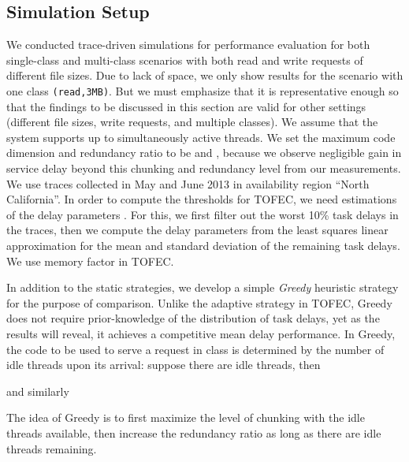 \documentclass[journal]{IEEEtran}
\newcommand{\ourproposal}{TOFEC\xspace}
\begin{document}
\subsection{Simulation Setup}
\label{ssec:eva:setup}

We conducted trace-driven simulations for performance evaluation for both single-class and multi-class scenarios with both read and write requests of different file sizes. 
Due to lack of space, we only show results for the scenario with one class {\tt (read,3MB)}. But we must emphasize that it is representative enough so that the findings to be discussed in this section are valid for other settings (different file sizes, write requests, and multiple classes). 
We assume that the system supports up to  simultaneously active threads. 
We set the maximum code dimension and redundancy ratio to be  and , because we observe negligible gain in service delay beyond this chunking and redundancy level from our measurements. 
We use traces collected in May and June 2013 in availability region ``North California''. In order to compute the thresholds for \ourproposal, we need estimations of the delay parameters . For this, we first filter out the worst 10\% task delays in the traces, then we compute the delay parameters from the least squares linear approximation for the mean and standard deviation of the remaining task delays. We use memory factor  in \ourproposal.

In addition to the static strategies, we develop a simple {\em Greedy} heuristic strategy for the purpose of comparison. Unlike the adaptive strategy in \ourproposal, Greedy does not require prior-knowledge of the distribution of task delays, yet as the results will reveal, it achieves a competitive mean delay performance. In Greedy, the code to be used to serve a request in class  is determined by the number of idle threads upon its arrival: suppose there are  idle threads, then

and similarly

The idea of Greedy is to first maximize the level of chunking with the idle threads available, then increase the redundancy ratio as long as there are idle threads remaining. 
\end{document}
